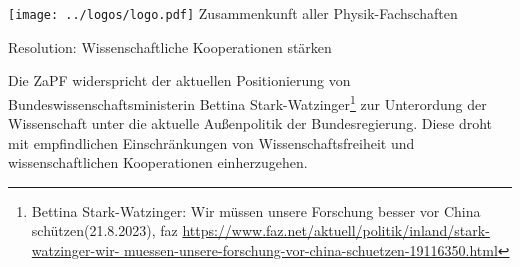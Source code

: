 \documentclass[DIV=calc]{scrartcl}
\let\oldgrqq=\grqq
\def\grqq{\oldgrqq\xspace}
\begin{document}
\hspace{0.87\textwidth}
\begin{minipage}{120pt}
	\vspace{-1.8cm}
	\texttt{[image: ../logos/logo.pdf]}
	\centering
	\small Zusammenkunft aller Physik-Fachschaften
\end{minipage}

\begin{center}
  \huge{Resolution: Wissenschaftliche Kooperationen stärken}\vspace{.25\baselineskip}\\
  \normalsize
\end{center}
\vspace{1cm}







Die ZaPF widerspricht der aktuellen Positionierung von Bundeswissenschaftsministerin Bettina Stark-Watzinger\footnote{Bettina Stark-Watzinger: \glqq Wir müssen unsere Forschung besser vor China schützen\grqq (21.8.2023), faz \url{https://www.faz.net/aktuell/politik/inland/stark-watzinger-wir- muessen-unsere-forschung-vor-china-schuetzen-19116350.html}} zur Unterordung der Wissenschaft unter die aktuelle Außenpolitik der Bundesregierung. Diese droht mit empfindlichen Einschränkungen von Wissenschaftsfreiheit und wissenschaftlichen Kooperationen einherzugehen.
\end{document}
